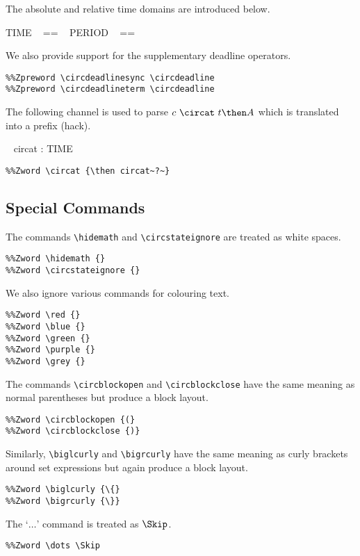 The absolute and relative time domains are introduced below.
%
\begin{zed}
  TIME ~ == ~ \nat
  \also
  PERIOD ~ == ~ \nat
\end{zed}

\nid
We also provide support for the supplementary {\SCJCircus} deadline operators.
%
\begin{verbatim}
%%Zpreword \circdeadlinesync \circdeadline
%%Zpreword \circdeadlineterm \circdeadline
\end{verbatim}

\nid
The following channel is used to parse $c~\circat~t \then A$ which is translated into a prefix (hack).
%
\begin{circus}
  \circchannel ~ circat : TIME
\end{circus}
%
\begin{verbatim}
%%Zword \circat {\then circat~?~}
\end{verbatim}

\subsection{Special Commands}

The commands \verb"\hidemath" and \verb"\circstateignore" are treated as white spaces.
%
\begin{verbatim}
%%Zword \hidemath {}
%%Zword \circstateignore {}
\end{verbatim}

\nid
We also ignore various commands for colouring text.
%
\begin{verbatim}
%%Zword \red {}
%%Zword \blue {}
%%Zword \green {}
%%Zword \purple {}
%%Zword \grey {}
\end{verbatim}

\nid
The commands \verb"\circblockopen" and \verb"\circblockclose" have the same meaning as normal parentheses but produce a block layout.
%
\begin{verbatim}
%%Zword \circblockopen {(}
%%Zword \circblockclose {)}
\end{verbatim}

\nid
Similarly, \verb"\biglcurly" and \verb"\bigrcurly" have the same meaning as curly brackets around set expressions but again produce a block layout.
%
\begin{verbatim}
%%Zword \biglcurly {\{}
%%Zword \bigrcurly {\}}
\end{verbatim}

\nid The `$\dots$' command is treated as $\Skip$.

\begin{verbatim}
%%Zword \dots \Skip
\end{verbatim}
